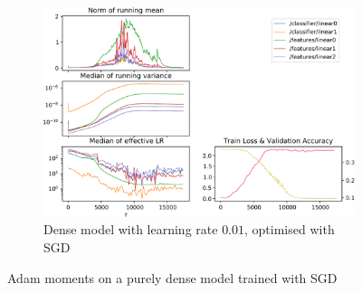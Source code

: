 \begin{figure}
    \begin{subfigure}{\textwidth}
        \centering
        \includegraphics[width=\linewidth]{gfx/diagrams/experiments/adam/fullyconnectedmodel_sgd_001_0_-1.pdf}
        \caption{Dense model with learning rate $0.01$, optimised with SGD}
    \end{subfigure}
    \caption{Adam moments on a purely dense model trained with SGD}
\end{figure}

